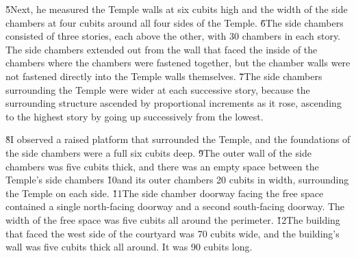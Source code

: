 \v{5}Next, he measured the Temple walls at six cubits high and the width of the side chambers at four cubits around all four sides of the Temple. \v{6}The side chambers consisted of three stories, each above the other, with 30 chambers in each story. The side chambers extended out from the wall that faced the inside of the chambers where the chambers were fastened together, but the chamber walls were not fastened directly into the Temple walls themselves. \v{7}The side chambers surrounding the Temple were wider at each successive story, because the surrounding structure ascended by proportional increments as it rose, ascending to the highest story by going up successively from the lowest.

\v{8}I observed a raised platform that surrounded the Temple, and the foundations of the side chambers were a full six cubits deep. \v{9}The outer wall of the side chambers was five cubits thick, and there was an empty space between the Temple's side chambers \v{10}and its outer chambers 20 cubits in width, surrounding the Temple on each side. \v{11}The side chamber doorway facing the free space contained a single north-facing doorway and a second south-facing doorway. The width of the free space was five cubits all around the perimeter. \v{12}The building that faced the west side of the courtyard was 70 cubits wide, and the building's wall was five cubits thick all around. It was 90 cubits long.

